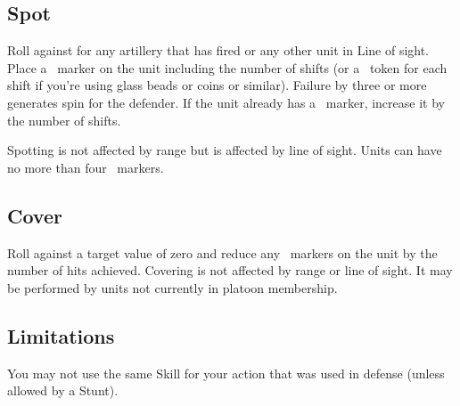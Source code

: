 \subsection{Spot}\label{sec:platoon-combat-spot}

Roll  against  for any artillery that has fired or any other unit in Line of sight. Place a \SPOTTED\ marker on the unit including the number of shifts (or a \SPOTTED\ token for each shift if you're using glass beads or coins or similar). Failure by three or more generates spin for the defender. If the unit already has a \SPOTTED\ marker, increase it by the number of shifts.

Spotting is not affected by range but is affected by line of sight. Units can have no more than four \SPOTTED\ markers.



\newpage
\subsection{Cover}\label{sec:platoon-combat-cover}

Roll  against a target value of zero and reduce any \SPOTTED\ markers on the unit by the number of hits achieved. Covering is not affected by range or line of sight. It may be performed by units not currently in platoon membership.

\subsection{Limitations}\label{sec:platoon-combat-limitations}

You may not use the same Skill for your action that was used in defense (unless allowed by a Stunt).

